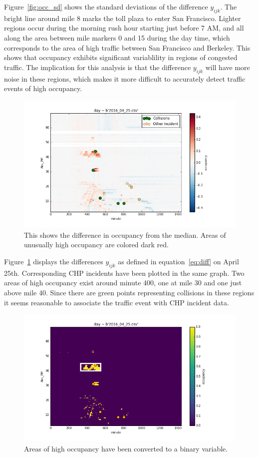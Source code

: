 \documentclass[12pt]{article}
\begin{document}
Figure~\ref{fig:occ_sd} shows the standard deviations of the difference
$y_{ijk}$. The bright line around mile 8 marks the toll plaza to enter
San Francisco. Lighter regions occur during the morning rush hour starting just
before 7 AM, and all along the area between mile markers 0 and 15 during
the day time, which corresponds to the area of high traffic between San
Francisco and Berkeley. This shows that occupancy exhibits significant
variablility in regions of congested traffic. The implication for this
analysis is that the difference $y_{ijk}$ will have more noise in these
regions, which makes it more difficult to accurately detect traffic events
of high occupancy.

\begin{figure}
    \label{fig:diffs}
    \centering
    \includegraphics[scale=0.5]{../diffs.png}
    \caption{This shows the difference in occupancy from the median. Areas
    of unusually high occupancy are colored dark red.
    }
\end{figure}

Figure~\ref{fig:diffs} displays the differences $y_{ijk}$ as defined in
equation~\ref{eq:diff} on April 25th.  Corresponding CHP incidents have
been plotted in the same graph.  Two areas of high occupancy exist around
minute 400, one at mile 30 and one just above mile 40. Since there are
green points representing collisions in these regions it seems reasonable to
associate the traffic event with CHP incident data.

\begin{figure}
    \label{fig:thresh}
    \centering
    \includegraphics[scale=0.5]{../thresh.png}
    \caption{Areas of high occupancy have been converted to a binary
    variable.}
\end{figure}
\end{document}
